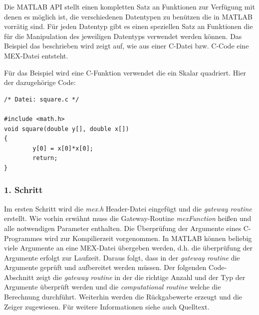 \documentclass[a4paper,11pt]{article}
\begin{document}
Die MATLAB API stellt einen kompletten Satz an Funktionen zur
Verfügung mit denen es möglich ist, die verschiedenen Datentypen
zu benützen die in MATLAB vorrätig sind. Für jeden Datentyp gibt
es einen speziellen Satz an Funktionen die für die Manipulation
des jeweiligen Datentyps verwendet werden können. Das Beispiel das
beschrieben wird zeigt auf, wie aus einer C-Datei bzw. C-Code
eine MEX-Datei entsteht.

Für das Beispiel wird eine C-Funktion verwendet die
ein Skalar quadriert. Hier der dazugehörige Code:
\begin{verbatim}
/* Datei: square.c */

#include <math.h>
void square(double y[], double x[])
{
        y[0] = x[0]*x[0];
        return;
}
\end{verbatim}

\subsubsection*{1. Schritt}
Im ersten Schritt wird die \textit{mex.h} Header-Datei eingefügt
und die \textit{gateway routine} erstellt. Wie vorhin erwähnt
muss die Gateway-Routine \textit{mexFunction} heißen und alle notwendigen
Parameter enthalten. Die Überprüfung der Argumente eines C-Programmes
wird zur Kompilierzeit vorgenommen. In MATLAB können beliebig viele
Argumente an eine MEX-Datei übergeben werden, d.h. die überprüfung der
Argumente erfolgt zur Laufzeit. Daraus folgt, dass in der
\textit{gateway routine} die Argumente geprüft und aufbereitet werden müssen.
Der folgenden Code-Abschnitt zeigt die \textit{gateway routine} in der
die richtige Anzahl und der Typ der Argumente überprüft werden und die
\textit{computational routine} welche die Berechnung durchführt. Weiterhin
werden die Rückgabewerte erzeugt und die Zeiger zugewiesen. Für weitere
Informationen siehe auch Quelltext.
\end{document}
